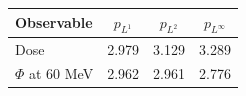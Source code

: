 \begin{tabular}{lccc}
\toprule
Observable & $p_{L^1}$ & $p_{L^2}$ & $p_{L^\infty}$ \\
\midrule
Dose & 2.979 & 3.129 & 3.289 \\
$\Phi$ at 60 MeV & 2.962 & 2.961 & 2.776 \\
\bottomrule
\end{tabular}
